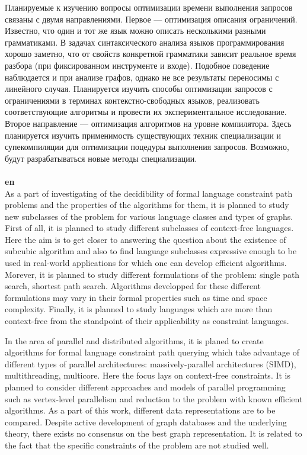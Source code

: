 \documentclass[12pt]{article}  %
\theoremstyle{remark}
\begin{document}
Планируемые к изучению вопросы оптимизации времени выполнения запросов связаны с двумя направлениями.
Первое --- оптимизация описания ограничений.
Известно, что один и тот же язык можно описать несколькими разными грамматиками.
В задачах синтаксического анализа языков программирования хорошо заметно, что от свойств конкретной грамматики зависит реальное время разбора (при фиксированном инструменте и входе).
Подобное поведение наблюдается и при анализе графов, однако не все результаты переносимы с линейного случая. Планируется изучить способы оптимизации запросов с ограничениями в терминах контекстно-свободных языков, реализовать соответствующие алгоритмы и провести их экспериментальное исследование. Второе направление --- оптимизация алгоритмов на уровне компилятора. Здесь планируется изучить применимость существующих техник специализации и супекомпиляции для оптимизации поцедуры выполнения запросов. Возможно, будут разрабатываться новые методы специализации.
\\
\\
\textbf{en}\\
As a part of investigating of the decidibility of formal language constraint path problems and the properties of the algorithms for them, it is planned to study new subclasses of the problem for various language classes and types of graphs.
First of all, it is planned to study different subclasses of context-free languages.
Here the aim is to get closer to answering the question about the existence of subcubic algorithm and also to find language subclasses expressive enough to be used in real-world applications for which one can develop efficient algorithms.
Morever, it is planned to study different formulations of the problem: single path search, shortest path search.
Algorithms developped for these different formulations may vary in their formal properties such as time and space complexity.
Finally, it is planned to study languages which are more than context-free from the standpoint of their applicability as constraint languages.

In the area of parallel and distributed algorithms, it is planed to create algorithms for formal language constraint path querying which take advantage of different types of parallel architectures: massively-parallel architectures (SIMD), multithreading, multicore.
Here the focus lays on context-free constraints.
It is planned to consider different approaches and models of parallel programming such as vertex-level parallelism and reduction to the problem with known efficient algorithms.
As a part of this work, different data representations are to be compared.
Despite active development of graph databases and the underlying theory, there exists no consensus on the best graph representation.
It is related to the fact that the specific constraints of the problem are not studied well.
\end{document}
